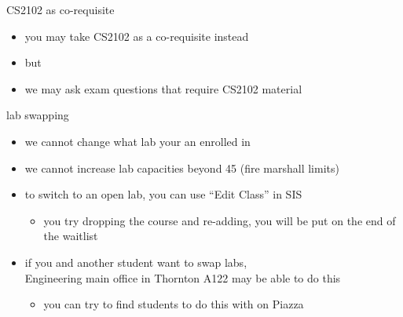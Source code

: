 \begin{frame}{CS2102 as co-requisite}
    \begin{itemize}
        \item you may take CS2102 as a co-requisite instead
        \item but 
        \item we may ask exam questions that require CS2102 material
    \end{itemize}
\end{frame}

\begin{frame}{lab swapping}
    \begin{itemize}
    \item we cannot change what lab your an enrolled in
    \item we cannot increase lab capacities beyond 45 (fire marshall limits)
    \item to switch to an open lab, you can use ``Edit Class'' in SIS
        \begin{itemize}
        \item you try dropping the course and re-adding, you will be put on the end of the waitlist
        \end{itemize}
    \item if you and another student want to swap labs, \\
          Engineering main office in Thornton A122 may be able to do this
        \begin{itemize}
        \item you can try to find students to do this with on Piazza
        \end{itemize}
    \end{itemize}
\end{frame}

